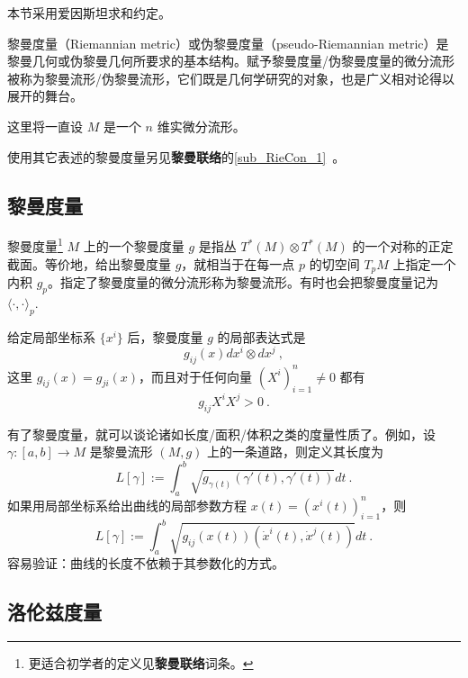 
本节采用爱因斯坦求和约定。

黎曼度量（Riemannian metric）或伪黎曼度量（pseudo-Riemannian metric）是黎曼几何或伪黎曼几何所要求的基本结构。赋予黎曼度量/伪黎曼度量的微分流形被称为黎曼流形/伪黎曼流形，它们既是几何学研究的对象，也是广义相对论得以展开的舞台。

这里将一直设 $M$ 是一个 $n$ 维实微分流形。

使用其它表述的黎曼度量另见\textbf{黎曼联络}的\autoref{sub_RieCon_1}~。

\subsection{黎曼度量}
\begin{definition}{黎曼度量\footnote{更适合初学者的定义见\textbf{黎曼联络}词条。}}
$M$ 上的一个黎曼度量 $g$ 是指丛 $T^*(M)\otimes T^*(M)$ 的一个对称的正定截面。等价地，给出黎曼度量 $g$，就相当于在每一点 $p$ 的切空间 $T_pM$ 上指定一个内积 $g_p$。指定了黎曼度量的微分流形称为黎曼流形。有时也会把黎曼度量记为 $\langle\cdot,\cdot\rangle_p$.
\end{definition}
给定局部坐标系 $\{x^i\}$ 后，黎曼度量 $g$ 的局部表达式是
$$
g_{ij}(x)dx^i\otimes dx^j~,
$$
这里 $g_{ij}(x)=g_{ji}(x)$，而且对于任何向量 $(X^i)_{i=1}^n\neq0$ 都有
$$
g_{ij}X^iX^j>0~.
$$

有了黎曼度量，就可以谈论诸如长度/面积/体积之类的度量性质了。例如，设 $\gamma:[a,b]\to M$ 是黎曼流形 $(M,g)$ 上的一条道路，则定义其长度为
$$
L[\gamma]:=\int_{a}^b \sqrt{g_{\gamma(t)}(\gamma'(t),\gamma'(t))}dt~.
$$
如果用局部坐标系给出曲线的局部参数方程 $x(t)=(x^i(t))_{i=1}^n$，则
$$
L[\gamma]:=\int_{a}^b \sqrt{g_{ij}(x(t))(\dot x^i(t),\dot x^j(t))}dt~.
$$
容易验证：曲线的长度不依赖于其参数化的方式。

\subsection{洛伦兹度量}